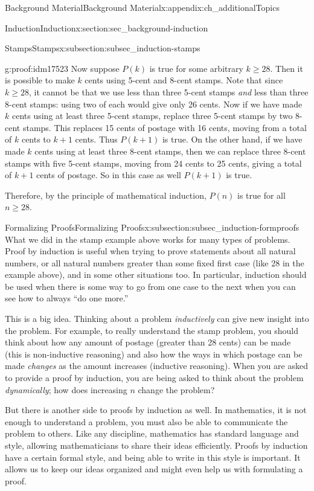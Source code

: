 \documentclass[oneside,10pt,]{book}
\numberwithin{equation}{chapter}
\begin{document}
\begin{appendixptx}{Background Material}{}{Background Material}{}{}{x:appendix:ch_additionalTopics}
\begin{sectionptx}{Induction}{}{Induction}{}{}{x:section:sec_background-induction}
\begin{subsectionptx}{Stamps}{}{Stamps}{}{}{x:subsection:subsec_induction-stamps}
\begin{proofptx}{}{g:proof:idm17523}
Now suppose \(P(k)\) is true for some arbitrary \(k \ge 28\). Then it is possible to make \(k\) cents using 5-cent and 8-cent stamps. Note that since \(k \ge 28\), it cannot be that we use less than three 5-cent stamps \emph{and} less than three 8-cent stamps: using two of each would give only 26 cents. Now if we have made \(k\) cents using at least three 5-cent stamps, replace three 5-cent stamps by two 8-cent stamps. This replaces 15 cents of postage with 16 cents, moving from a total of \(k\) cents to \(k+1\) cents. Thus \(P(k+1)\) is true. On the other hand, if we have made \(k\) cents using at least three 8-cent stamps, then we can replace three 8-cent stamps with five 5-cent stamps, moving from 24 cents to 25 cents, giving a total of \(k+1\) cents of postage. So in this case as well \(P(k+1)\) is true.%
\par
Therefore, by the principle of mathematical induction, \(P(n)\) is true for all \(n \ge 28\).%
\end{proofptx}
\end{subsectionptx}
%
%
\typeout{************************************************}
\typeout{************************************************}
%
\begin{subsectionptx}{Formalizing Proofs}{}{Formalizing Proofs}{}{}{x:subsection:subsec_induction-formproofs}
What we did in the stamp example above works for many types of problems. Proof by induction is useful when trying to prove statements about all natural numbers, or all natural numbers greater than some fixed first case (like 28 in the example above), and in some other situations too. In particular, induction should be used when there is some way to go from one case to the next \textendash{} when you can see how to always ``do one more.''%
\par
This is a big idea. Thinking about a problem \emph{inductively} can give new insight into the problem. For example, to really understand the stamp problem, you should think about how any amount of postage (greater than 28 cents) can be made (this is non-inductive reasoning) and also how the ways in which postage can be made \emph{changes} as the amount increases (inductive reasoning). When you are asked to provide a proof by induction, you are being asked to think about the problem \emph{dynamically}; how does increasing \(n\) change the problem?%
\par
But there is another side to proofs by induction as well. In mathematics, it is not enough to understand a problem, you must also be able to communicate the problem to others. Like any discipline, mathematics has standard language and style, allowing mathematicians to share their ideas efficiently. Proofs by induction have a certain formal style, and being able to write in this style is important. It allows us to keep our ideas organized and might even help us with formulating a proof.%

\end{subsectionptx}
\end{sectionptx}
\end{appendixptx}
\end{document}
